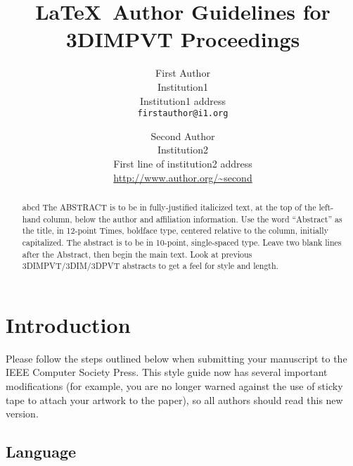 \documentclass[10pt,twocolumn,letterpaper]{article}
\begin{document}
\title{\LaTeX\ Author Guidelines for 3DIMPVT Proceedings}

\author{First Author\\
  Institution1\\
  Institution1 address\\
  {\tt\small firstauthor@i1.org}
  \and
  Second Author\\
  Institution2\\
  First line of institution2 address\\
  {\small\url{http://www.author.org/~second}} }

\maketitle

\begin{abstract}
  abcd The ABSTRACT is to be in fully-justified italicized text, at the top
  of the left-hand column, below the author and affiliation
  information. Use the word ``Abstract'' as the title, in 12-point
  Times, boldface type, centered relative to the column, initially
  capitalized. The abstract is to be in 10-point, single-spaced type.
  Leave two blank lines after the Abstract, then begin the main text.
  Look at previous 3DIMPVT/3DIM/3DPVT abstracts to get a feel for
  style and length.
\end{abstract}

\section{Introduction}

Please follow the steps outlined below when submitting your manuscript
to the IEEE Computer Society Press.  This style guide now has several
important modifications (for example, you are no longer warned against
the use of sticky tape to attach your artwork to the paper), so all
authors should read this new version.

\subsection{Language}
\end{document}
